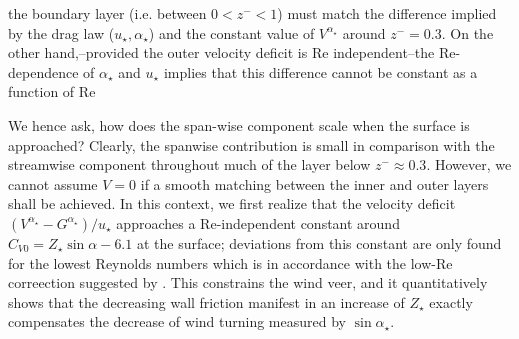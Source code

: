 \documentclass[a4paper,11pt]{amsart}
\newcommand{\RE}{\mathrm{Re}}
\begin{document}
the boundary layer (i.e. between $0<z^-<1$) must match the difference implied by the drag law ($u_\star, \alpha_\star$)
and the constant value of $V^{\alpha_\star}$ around $z^-=0.3$.
%
On the other hand,--provided the outer velocity deficit is $\RE$ independent--the $\RE$-dependence
of $\alpha_\star$ and $u_\star$ implies that this difference cannot be constant as a function of $\RE$
%
\par 
%
We hence ask, how does the span-wise component scale when the surface is approached?
%
Clearly, the spanwise contribution is small in comparison with the streamwise component
throughout much of the layer below $z^-\approx 0.3$. 
%
However, we cannot assume $V=0$ if a smooth matching between the inner and outer layers shall be achieved. 
%
In this context, we first realize that the velocity deficit $(V^{\alpha_\star}-G^{\alpha_\star})/u_\star$
approaches a $\RE$-independent constant around $C_{V0}=Z_\star \sin\alpha -6.1$ at the surface; deviations from
this constant are only found for the lowest Reynolds numbers which is in accordance with
the low-$\RE$ correection suggested by \cite{spalart:JFM1989}.
%
This constrains the wind veer, and it quantitatively shows that the decreasing wall friction manifest in an
increase of $Z_\star$ exactly compensates the decrease of wind turning measured by $\sin\alpha_\star$. 
\end{document}
